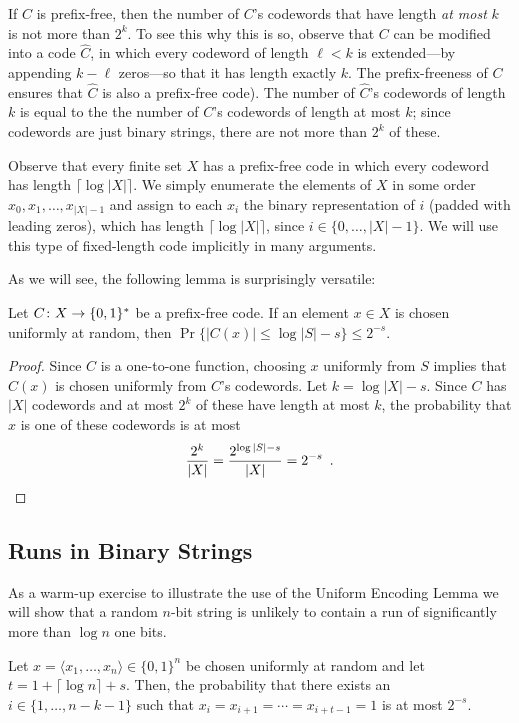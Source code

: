 \documentclass[lotsofwhite]{patmorin}
\begin{document}
If $C$ is prefix-free, then the number of $C$'s codewords that have length
\emph{at most} $k$ is not more than $2^k$. To see this why this is so,
observe that $C$ can be modified into a code $\hat C$, in which every
codeword of length $\ell <k$ is extended---by appending $k-\ell$ zeros---so that
it has length exactly $k$. The prefix-freeness of $C$ ensures that $\hat
C$ is also a prefix-free code). The number of $\hat C$'s codewords of
length $k$ is equal to the the number of $C$'s codewords of length at
most $k$; since codewords are just binary strings, there are not more
than $2^k$ of these.

Observe that every finite set $X$ has a prefix-free code in which every
codeword has length $\lceil\log |X|\rceil$. We simply enumerate the
elements of $X$ in some order $x_0,x_1,\ldots,x_{|X|-1}$ and assign to
each $x_i$ the binary representation of $i$ (padded with leading zeros),
which has length $\lceil\log |X|\rceil$, since $i\in\{0,\ldots,|X|-1\}$.
We will use this type of fixed-length code implicitly in many arguments.

As we will see, the following lemma is surprisingly versatile:
\begin{lem}
  Let $C\colon X\to \{0,1\}^*$ be a prefix-free code. If an element $x\in
  X$ is chosen uniformly at random, then $\Pr\{|C(x)|\le \log|S|-s\}\le
  2^{-s}$.
\end{lem}

\begin{proof}
  Since $C$ is a one-to-one function, choosing $x$ uniformly from $S$
  implies that $C(x)$ is chosen uniformly from $C$'s codewords. Let
  $k=\log|X|-s$. Since $C$ has $|X|$ codewords and at most $2^{k}$ of these
  have length at most $k$, the probability that $x$ is one of these 
  codewords is at most
  \[
     \frac{2^k}{|X|} = \frac{2^{\log|S|-s}}{|X|} = 2^{-s} \enspace . \qedhere 
  \]
\end{proof}

\subsection{Runs in Binary Strings}

As a warm-up exercise to illustrate the use of the Uniform Encoding
Lemma we will show that a random $n$-bit string is unlikely to contain
a run of significantly more than $\log n$ one bits.

\begin{thm}
  Let $x=\langle x_1,\ldots,x_n\rangle\in\{0,1\}^n$ be chosen
  uniformly at random and let $t=1+\lceil\log n\rceil + s$. Then, the
  probability that there exists an $i\in\{1,\ldots,n-k-1\}$ such that
  $x_i=x_{i+1}=\cdots=x_{i+t-1}=1$ is at most $2^{-s}$.
\end{thm}
\end{document}
